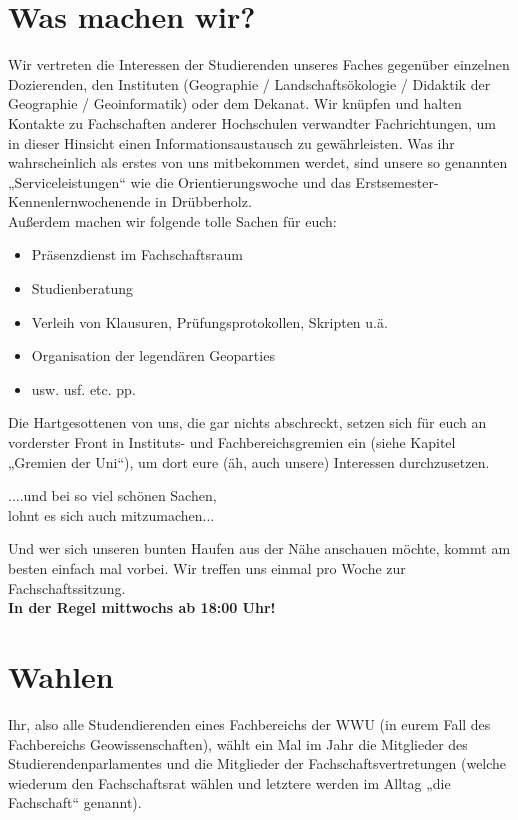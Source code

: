 \section*{Was machen wir?}
Wir vertreten die Interessen der Studierenden unseres Faches gegenüber einzelnen Dozierenden, den Instituten (Geographie / Landschaftsökologie / Didaktik der Geographie / Geoinformatik) oder dem Dekanat. Wir knüpfen und halten Kontakte zu Fachschaften anderer Hochschulen verwandter Fachrichtungen, um in dieser Hinsicht einen Informationsaustausch zu gewährleisten. Was ihr wahrscheinlich als erstes von uns mitbekommen werdet, sind unsere so genannten „Serviceleistungen“ wie die Orientierungswoche und das Erstsemester-Kennenlernwochenende in Drübberholz.
\\
Außerdem machen wir folgende tolle Sachen für euch:
\begin{itemize}
 \item Präsenzdienst im Fachschaftsraum
 \item Studienberatung
 \item Verleih von Klausuren, Prüfungsprotokollen, Skripten u.ä.
 \item Organisation der legendären Geoparties
 \item usw. usf. etc. pp.
\end{itemize}
Die Hartgesottenen von uns, die gar nichts abschreckt, setzen sich für euch an vorderster Front in Instituts- und Fachbereichsgremien ein
(siehe Kapitel „Gremien der Uni“), um dort eure (äh, auch unsere) Interessen durchzusetzen.
\begin{center}
....und bei so viel schönen Sachen,\\
lohnt es sich auch mitzumachen...                                            
\end{center}
Und wer sich unseren bunten Haufen aus der Nähe anschauen möchte, kommt am besten einfach mal vorbei.
Wir treffen uns einmal pro Woche zur Fachschaftssitzung.\\
\textbf{In der Regel mittwochs ab 18:00 Uhr!}

\section*{Wahlen}
Ihr, also alle Studendierenden eines Fachbereichs der WWU (in eurem Fall des Fachbereichs Geowissenschaften), wählt ein Mal im Jahr die Mitglieder des Studierendenparlamentes und die Mitglieder der Fachschaftsvertretungen (welche wiederum den Fachschaftsrat wählen und letztere werden im Alltag „die Fachschaft“ genannt).

